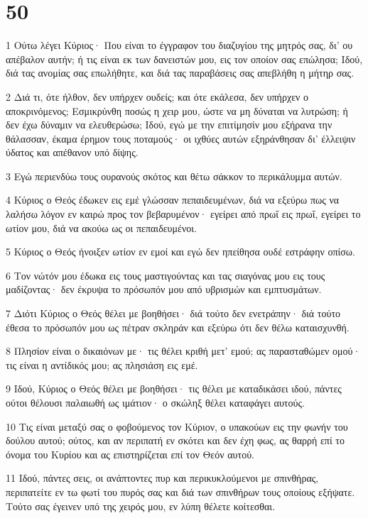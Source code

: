 \chapter{50}

\par 1 Ούτω λέγει Κύριος· Που είναι το έγγραφον του διαζυγίου της μητρός σας, δι' ου απέβαλον αυτήν; ή τις είναι εκ των δανειστών μου, εις τον οποίον σας επώλησα; Ιδού, διά τας ανομίας σας επωλήθητε, και διά τας παραβάσεις σας απεβλήθη η μήτηρ σας.
\par 2 Διά τι, ότε ήλθον, δεν υπήρχεν ουδείς; και ότε εκάλεσα, δεν υπήρχεν ο αποκρινόμενος; Εσμικρύνθη ποσώς η χειρ μου, ώστε να μη δύναται να λυτρώση; ή δεν έχω δύναμιν να ελευθερώσω; Ιδού, εγώ με την επιτίμησίν μου εξήρανα την θάλασσαν, έκαμα έρημον τους ποταμούς· οι ιχθύες αυτών εξηράνθησαν δι' έλλειψιν ύδατος και απέθανον υπό δίψης.
\par 3 Εγώ περιενδύω τους ουρανούς σκότος και θέτω σάκκον το περικάλυμμα αυτών.
\par 4 Κύριος ο Θεός έδωκεν εις εμέ γλώσσαν πεπαιδευμένων, διά να εξεύρω πως να λαλήσω λόγον εν καιρώ προς τον βεβαρυμένον· εγείρει από πρωΐ εις πρωΐ, εγείρει το ωτίον μου, διά να ακούω ως οι πεπαιδευμένοι.
\par 5 Κύριος ο Θεός ήνοιξεν ωτίον εν εμοί και εγώ δεν ηπείθησα ουδέ εστράφην οπίσω.
\par 6 Τον νώτόν μου έδωκα εις τους μαστιγούντας και τας σιαγόνας μου εις τους μαδίζοντας· δεν έκρυψα το πρόσωπόν μου από υβρισμών και εμπτυσμάτων.
\par 7 Διότι Κύριος ο Θεός θέλει με βοηθήσει· διά τούτο δεν ενετράπην· διά τούτο έθεσα το πρόσωπόν μου ως πέτραν σκληράν και εξεύρω ότι δεν θέλω καταισχυνθή.
\par 8 Πλησίον είναι ο δικαιόνων με· τις θέλει κριθή μετ' εμού; ας παρασταθώμεν ομού· τις είναι η αντίδικός μου; ας πλησιάση εις εμέ.
\par 9 Ιδού, Κύριος ο Θεός θέλει με βοηθήσει· τις θέλει με καταδικάσει ιδού, πάντες ούτοι θέλουσι παλαιωθή ως ιμάτιον· ο σκώληξ θέλει καταφάγει αυτούς.
\par 10 Τις είναι μεταξύ σας ο φοβούμενος τον Κύριον, ο υπακούων εις την φωνήν του δούλου αυτού; ούτος, και αν περιπατή εν σκότει και δεν έχη φως, ας θαρρή επί το όνομα του Κυρίου και ας επιστηρίζεται επί τον Θεόν αυτού.
\par 11 Ιδού, πάντες σεις, οι ανάπτοντες πυρ και περικυκλούμενοι με σπινθήρας, περιπατείτε εν τω φωτί του πυρός σας και διά των σπινθήρων τους οποίους εξήψατε. Τούτο σας έγεινεν υπό της χειρός μου, εν λύπη θέλετε κοίτεσθαι.

